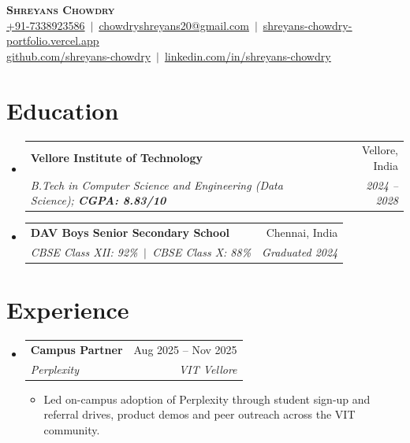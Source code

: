\documentclass[a4paper,11pt]{article}
\makeatletter
\newcommand{\lnk}[2]{\href{#1}{\underline{#2}}}
\newcommand{\resumeItem}[1]{\item\small{{#1 \vspace{-2.5pt}}}}
\newcommand{\resumeSubheading}[4]{\vspace{-2pt}\item
  \begin{tabular*}{0.97\textwidth}[t]{l@{\extracolsep{\fill}}r}
    \textbf{#1} & #2 \\ \textit{\small#3} & \textit{\small #4} \\
  \end{tabular*}\vspace{-7pt}}
\newcommand{\resumeSubHeadingListStart}{\begin{itemize}[leftmargin=0.15in, label={}]}
\newcommand{\resumeSubHeadingListEnd}{\end{itemize}}
\newcommand{\resumeItemListStart}{\begin{itemize}[itemsep=0pt,topsep=1.5pt]}
\newcommand{\resumeItemListEnd}{\end{itemize}\vspace{-5.5pt}}
\makeatother
\begin{document}
\begin{center}
\textbf{\Huge \scshape Shreyans Chowdry} \\ \vspace{3pt}
\small \href{tel:+917338923586}{+91-7338923586} \,$|$\, \lnk{mailto:chowdryshreyans20@gmail.com}{chowdryshreyans20@gmail.com} \,$|$\, \lnk{https://shreyans-chowdry-portfolio.vercel.app}{shreyans-chowdry-portfolio.vercel.app} \\[1pt]
\lnk{https://github.com/shreyans-chowdry}{github.com/shreyans-chowdry} \,$|$\, \lnk{https://www.linkedin.com/in/shreyans-chowdry}{linkedin.com/in/shreyans-chowdry}
\end{center}
\section{Education}
\resumeSubHeadingListStart
\resumeSubheading{Vellore Institute of Technology}{Vellore, India}{B.Tech in Computer Science and Engineering (Data Science); \textbf{CGPA: 8.83/10}}{2024 -- 2028}
\resumeSubheading{DAV Boys Senior Secondary School}{Chennai, India}{CBSE Class XII: 92\% \,$|$\, CBSE Class X: 88\%}{Graduated 2024}
\resumeSubHeadingListEnd
\section{Experience}
\resumeSubHeadingListStart
\resumeSubheading{Campus Partner}{Aug 2025 -- Nov 2025}{Perplexity}{VIT Vellore}
\resumeItemListStart
\resumeItem{Led on-campus adoption of Perplexity through student sign-up and referral drives, product demos and peer outreach across the VIT community.}
\resumeItemListEnd
\resumeSubHeadingListEnd
\end{document}

